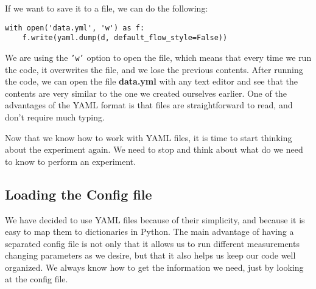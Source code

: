 If we want to save it to a file, we can do the following:

\begin{verbatim}
with open('data.yml', 'w') as f:
    f.write(yaml.dump(d, default_flow_style=False))
\end{verbatim}

We are using the \texttt{'w'} option to open the file, which means that every time we run the code, it overwrites the file, and we lose the previous contents. After running the code, we can open the file \textbf{data.yml} with any text editor and see that the contents are very similar to the one we created ourselves earlier. One of the advantages of the YAML format is that files are straightforward to read, and don't require much typing.





Now that we know how to work with YAML files, it is time to start thinking about the experiment again. We need to stop and think about what do we need to know to perform an experiment.


\subsection{Loading the Config file}\label{subsection:loading-the-config}
We have decided to use YAML files because of their simplicity, and because it is easy to map them to dictionaries in Python. The main advantage of having a separated config file is not only that it allows us to run different measurements changing parameters as we desire, but that it also helps us keep our code well organized. We always know how to get the information we need, just by looking at the config file.

